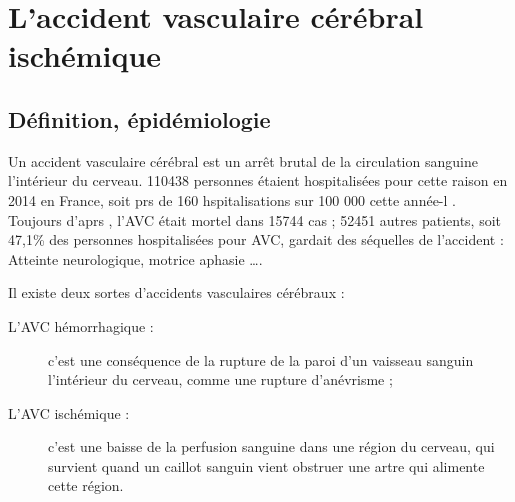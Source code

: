 \section{L'accident vasculaire c\'er\'ebral isch\'emique}




\subsection{D\'efinition, \'epid\'emiologie}

Un accident vasculaire c\'er\'ebral est un arr\^et brutal de la circulation sanguine  l'int\'erieur du cerveau. %
110438 personnes \'etaient hospitalis\'ees pour cette raison en 2014 en France, soit prs de 160 hspitalisations sur 100 000 cette ann\'ee-l \cite{epi_hem16}. %
Toujours d'aprs \cite{epi_hem16}, l'AVC \'etait mortel dans 15744 cas ; %
52451 autres patients, soit 47,1\% des personnes hospitalis\'ees pour AVC, gardait des s\'equelles de l'accident : %
Atteinte neurologique, motrice aphasie \dots.

\par
Il existe deux sortes d'accidents vasculaires c\'er\'ebraux :
\begin{description}
\item[L'AVC h\'emorrhagique : ] c'est une cons\'equence de la rupture de la paroi d'un vaisseau sanguin  l'int\'erieur du cerveau, comme une rupture d'an\'evrisme ;
\item[L'AVC isch\'emique : ] c'est une baisse de la perfusion sanguine dans une r\'egion du cerveau, qui survient quand un caillot sanguin vient obstruer une artre qui alimente cette r\'egion.
\end{description}

